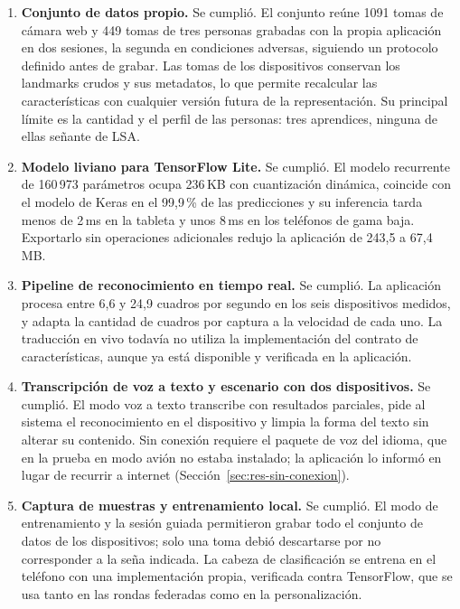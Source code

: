 \begin{enumerate}
    \item \textbf{Conjunto de datos propio.} Se cumplió. El conjunto reúne 1091 tomas de cámara web y 449 tomas de tres personas grabadas con la propia aplicación en dos sesiones, la segunda en condiciones adversas, siguiendo un protocolo definido antes de grabar. Las tomas de los dispositivos conservan los landmarks crudos y sus metadatos, lo que permite recalcular las características con cualquier versión futura de la representación. Su principal límite es la cantidad y el perfil de las personas: tres aprendices, ninguna de ellas señante de LSA.

    \item \textbf{Modelo liviano para TensorFlow Lite.} Se cumplió. El modelo recurrente de 160\,973 parámetros ocupa 236\,KB con cuantización dinámica, coincide con el modelo de Keras en el 99,9\,\% de las predicciones y su inferencia tarda menos de 2\,ms en la tableta y unos 8\,ms en los teléfonos de gama baja. Exportarlo sin operaciones adicionales redujo la aplicación de 243,5 a 67,4\,MB.

    \item \textbf{Pipeline de reconocimiento en tiempo real.} Se cumplió. La aplicación procesa entre 6,6 y 24,9 cuadros por segundo en los seis dispositivos medidos, y adapta la cantidad de cuadros por captura a la velocidad de cada uno. La traducción en vivo todavía no utiliza la implementación del contrato de características, aunque ya está disponible y verificada en la aplicación.

    \item \textbf{Transcripción de voz a texto y escenario con dos dispositivos.} Se cumplió. El modo voz a texto transcribe con resultados parciales, pide al sistema el reconocimiento en el dispositivo y limpia la forma del texto sin alterar su contenido. Sin conexión requiere el paquete de voz del idioma, que en la prueba en modo avión no estaba instalado; la aplicación lo informó en lugar de recurrir a internet (Sección~\ref{sec:res-sin-conexion}).

    \item \textbf{Captura de muestras y entrenamiento local.} Se cumplió. El modo de entrenamiento y la sesión guiada permitieron grabar todo el conjunto de datos de los dispositivos; solo una toma debió descartarse por no corresponder a la seña indicada. La cabeza de clasificación se entrena en el teléfono con una implementación propia, verificada contra TensorFlow, que se usa tanto en las rondas federadas como en la personalización.


\end{enumerate}
